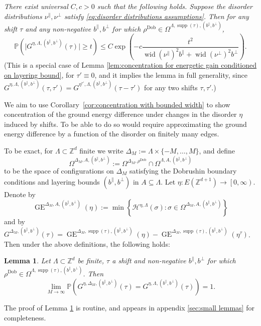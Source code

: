 \documentclass[11pt, reqno]{amsart}
\newtheorem{lemma}[theorem]{Lemma}
\newcommand{\Z}{\mathbb{Z}}
\DeclareMathOperator{\supp}{supp}
\DeclareMathOperator{\Dob}{Dob}
\DeclareMathOperator{\GE}{GE}
\renewcommand{\P}{\mathbb{P}}
\DeclareMathOperator{\wid}{wid}
\numberwithin{equation}{section}
\begin{document}
\smallskip
\noindent
{\it There exist universal $C,c>0$ such that the following holds. Suppose the disorder distributions $\nu^{\parallel},\nu^{\perp}$ satisfy \eqref{eq:disorder distributions assumptions}.
Then for any shift $\tau$ and any non-negative $b^{\parallel},b^{\perp}$ for which $\rho^{\Dob}\in\Omega^{\Lambda,\supp(\tau),(b^{\parallel},b^{\perp})}$,}
\begin{equation}
\label{eq:6.2_equiv}
\P\left(\lvert G^{\eta, \Lambda,(b^{\parallel},b^{\perp})} (\tau) \rvert \ge t\right)\le
C\exp \left(-c \frac{t^2}{\wid (\nu^{\parallel})^{2}  b^{\parallel}+\wid (\nu^{\perp})^{2} b^{\perp}} \right).
\end{equation} 
(This is a special case of Lemma \ref{lem:concentration for energetic gain conditioned on layering bound}, for $\tau'\equiv 0$, and it implies the lemma in full generality, since $G^{\eta, \Lambda,(b^{\parallel},b^{\perp})} (\tau,\tau')=G^{\eta^{\tau'}, \Lambda,(b^{\parallel},b^{\perp})} (\tau-\tau')$ for any two shifts $\tau,\tau'$.)

We aim to use Corollary~\ref{cor:concentration with bounded width} to show concentration of the ground energy difference under changes in the disorder $\eta$ induced by shifts. To be able to do so would require approximating the ground energy difference by a function of the disorder on finitely many edges. 

To be exact, for $\Lambda\subset\Z^d$ finite we write $\Delta_M:=\Lambda \times \{-M,\dots, M\}$, and define 
\begin{equation*}
\Omega^{\Delta_M, A, (b^{\parallel},b^{\perp})}:=\Omega^{\Delta_M,\rho^{\Dob}}\cap 
\Omega^{\Lambda, A, (b^{\parallel},b^{\perp})}    
\end{equation*}
to be the space of configurations on $\Delta_M$ satisfying the Dobrushin boundary conditions and layering bounds $(b^\parallel,b^{\perp})$ in $A\subseteq\Lambda$.
Let $\eta:E(\Z^{d+1}) \rightarrow \left[0,\infty \right)$. Denote by 
\begin{equation*}
\GE^{\Delta_M,A, (b^{\parallel},b^{\perp})}(\eta):=
\min \left\{ \mathcal{H}^{\eta,\Lambda}(\sigma): \sigma \in \Omega^{\Delta_M, A, (b^{\parallel},b^{\perp})} \right\}
\end{equation*}
and by $G^{\Delta_M, (b^{\parallel},b^{\perp})}(\tau)=
\GE^{\Delta_M,\supp(\tau), (b^{\parallel},b^{\perp})}(\eta)-\GE^{\Delta_M,\supp(\tau), (b^{\parallel},b^{\perp})}(\eta^{\tau})
$.
Then under the above definitions, the following holds: 
\begin{lemma}\label{lem: bounded_layering_finite_to_semi_infinite_convergence}
Let $\Lambda\subset \Z^d$ be finite, $\tau$ a shift and non-negative $b^{\parallel},b^{\perp}$ for which $\rho^{\Dob}\in\Omega^{\Lambda,\supp(\tau),(b^{\parallel},b^{\perp})}$.
Then
\begin{equation*}
\lim_{M\rightarrow \infty}\P\left(G^{\eta,\Delta_M, (b^{\parallel},b^{\perp})}(\tau) =G^{\eta,\Lambda,(b^{\parallel},b^{\perp})}(\tau) \right)=1.
\end{equation*}    
\end{lemma}
The proof of Lemma \ref{lem: bounded_layering_finite_to_semi_infinite_convergence} is routine, and appears in appendix \ref{sec:small lemmas} for completeness.
\end{document}
